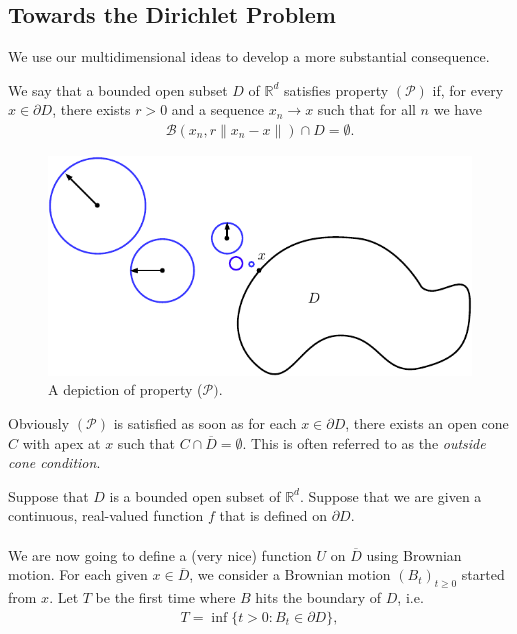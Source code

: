 \documentclass[../mainfile.tex]{subfiles}
\begin{document}
\subsection{Towards the Dirichlet Problem}
We use our multidimensional ideas to develop a more substantial consequence.
\begin{defn} We say that a bounded open subset $D$ of $\mathbb{R}^d$ satisfies property $(\mathcal{P})$ if, for every $x \in \partial D$, there exists $r>0$ and a sequence $x_n \to x$ such that for all $n$ we have
\begin{align*}
\mathcal{B}(x_n,r \|x_n-x\|) \cap D = \emptyset. 
\end{align*}
\end{defn}
\begin{figure}[hbtp]
\centering
\includegraphics[scale=.8]{propp.pdf}
\caption{A depiction of property ($\mathcal{P})$. }
\end{figure}
\begin{rem} Obviously $(\mathcal{P})$ is satisfied as soon as for each $x \in \partial D$, there exists an open cone $C$ with apex at $x$ such that $C \cap \overline{D}= \emptyset$. This is often referred to as the \textit{outside cone condition}. 
\end{rem}
\newpage
Suppose that $D$ is a bounded open subset of $\mathbb{R}^d$. Suppose that we are given a continuous, real-valued function $f$ that is defined on $\partial D$.
\\\\
 We are now going to define a (very nice) function $U$ on $\overline{D}$ using Brownian motion. For each given $x \in \overline{D}$, we consider a Brownian motion $(B_t)_{t \geq 0}$ started from $x$. Let $T$ be the first time where $B$ hits the boundary of $D$, i.e. \begin{align*}
T = \inf \{ t >0 : B_t \in \partial D \},
\end{align*}
\end{document}
